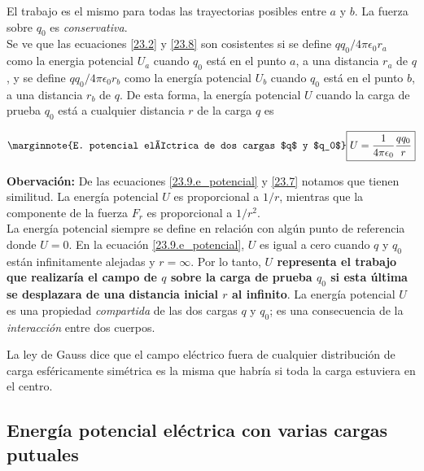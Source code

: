 El trabajo es el mismo para todas las trayectorias posibles entre $a$ y $b$. La fuerza sobre $q_0$ es \textit{conservativa}.\\
Se ve que las ecuaciones \ref{23.2} y \ref{23.8} son cosistentes si se define $qq_0/4\pi\epsilon_0r_a$ como la energia potencial $U_a$ cuando $q_0$ está en el punto $a$, a una distancia $r_a$ de $q$, y se define $qq_0/4\pi\epsilon_0r_b$ como la energía potencial $U_b$ cuando $q_0$ está en el punto $b$, a una distancia $r_b$ de $q$. De esta forma, la energía potencial $U$ cuando la carga de prueba $q_0$ está a cualquier distancia $r$ de la carga $q$ es

\begin{equation}\label{23.9.e_potencial}\marginnote{E. potencial eléctrica de dos cargas $q$ y $q_0$}
\boxed{U=\frac{1}{4\pi\epsilon_0}\frac{qq_0}{r}}
\end{equation}

\textbf{Obervación:} De las ecuaciones \ref{23.9.e_potencial} y \ref{23.7} notamos que tienen similitud. La energía potencial $U$ es proporcional a $1/r$, mientras que la componente de la fuerza $F_r$ es proporcional a $1/r^2$.\\
La energía potencial siempre se define en relación con algún punto de referencia donde $U=0$. En la ecuación \ref{23.9.e_potencial}, $U$ es igual a cero cuando $q$ y $q_0$ están infinitamente alejadas y $r=\infty$. Por lo tanto, \textbf{$U$ representa el trabajo que realizaría el campo de $q$ sobre la carga de prueba $q_0$ si esta última se desplazara de una distancia inicial $r$ al infinito}. La energía potencial $U$ es una propiedad \textit{compartida} de las dos cargas $q$ y $q_0$; es una consecuencia de la \textit{interacción} entre dos cuerpos.

La ley de Gauss dice que el campo eléctrico fuera de cualquier distribución de carga esféricamente simétrica es la misma que habría si toda la carga estuviera en el centro.

\subsection{Energía potencial eléctrica con varias cargas putuales}

